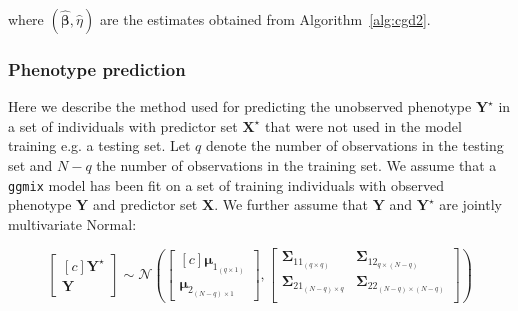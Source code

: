 \documentclass[12pt,letter]{article}\usepackage[]{graphicx}\usepackage[]{color}
\newcommand{\bX}{\textbf{X}}
\newcommand{\bY}{\textbf{Y}}
\newcommand{\bD}{\textbf{D}}
\newcommand{\bXtilde}{\widetilde{\bX}}
\newcommand{\bYtilde}{\widetilde{\bY}}
\newcommand{\bDtilde}{\widetilde{\bD}}
\newcommand{\bU}{\textbf{U}}
\newcommand{\bV}{\textbf{V}}
\newcommand{\bb}{\textbf{\emph{b}}}
\newcommand{\bSigma}{\boldsymbol{\Sigma}}
\newcommand{\bmu}{\boldsymbol{\mu}}
\newcommand{\bbeta}{\boldsymbol{\beta}}
\newcommand{\bPhi}{\boldsymbol{\Phi}}
\begin{document}
where $(\widehat{\bbeta}, \widehat{\eta})$ are the estimates obtained from Algorithm~\ref{alg:cgd2}.



\subsubsection{Phenotype prediction} \label{phenoprediction}

Here we describe the method used for predicting the unobserved phenotype $\bY^\star$ in a set of individuals with predictor set $\bX^\star$ that were not used in the model training e.g. a testing set. Let $q$ denote the number of observations in the testing set and $N-q$ the number of observations in the training set. We assume that a \texttt{ggmix} model has been fit on a set of training individuals with observed phenotype $\bY$ and predictor set $\bX$.  We further assume that $\bY$ and $\bY^\star$ are jointly multivariate Normal:

\begin{equation}
\left[ \begin{matrix*}[c]
\bY^\star \\
\bY
\end{matrix*}\right] \sim \mathcal{N} \left( \left[\begin{matrix*}[c]
\bmu_{1_{(q\times 1)}} \\
\bmu_{2_{(N-q)\times 1}}
\end{matrix*}\right], \left[ \begin{matrix}
\bSigma_{11_{(q\times q)}} & \bSigma_{12_{q\times (N-q)}} \\
\bSigma_{21_{(N-q)\times q}} & \bSigma_{22_{(N-q)\times (N-q)}}  \\
\end{matrix}   \right]  \right)
\end{equation}
\end{document}
